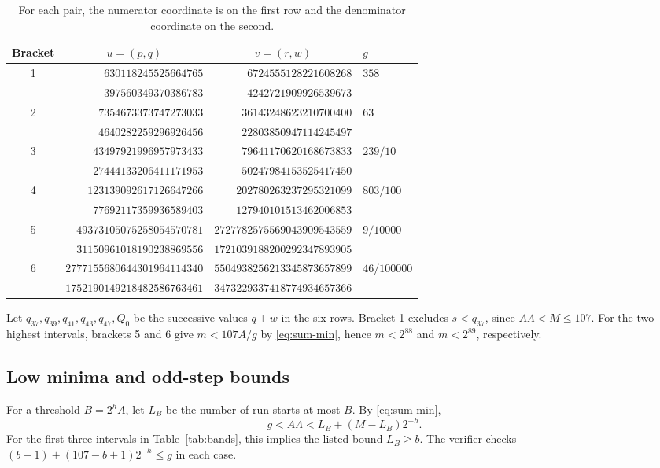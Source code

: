\documentclass[11pt]{article}
\theoremstyle{definition}
\begin{document}
\begin{table}[htbp]
\centering
\small
\begin{tabular}{@{}c r r l@{}}
\toprule
Bracket & \multicolumn{1}{c}{\(u=(p,q)\)} &
 \multicolumn{1}{c}{\(v=(r,w)\)} & \(g\)\\
\midrule
1 & \(630118245525664765\) & \(6724555128221608268\) & \(358\)\\
  & \(397560349370386783\) & \(4242721909926539673\) &\\[2pt]
2 & \(7354673373747273033\) & \(36143248623210700400\) & \(63\)\\
  & \(4640282259296926456\) & \(22803850947114245497\) &\\[2pt]
3 & \(43497921996957973433\) & \(79641170620168673833\) & \(239/10\)\\
  & \(27444133206411171953\) & \(50247984153525417450\) &\\[2pt]
4 & \(123139092617126647266\) & \(202780263237295321099\) & \(803/100\)\\
  & \(77692117359936589403\) & \(127940101513462006853\) &\\[2pt]
5 & \(49373105075258054570781\) & \(2727782575569043909543559\) &
  \(9/10000\)\\
  & \(31150961018190238869556\) & \(1721039188200292347893905\) &\\[2pt]
6 & \(2777155680644301964114340\) & \(5504938256213345873657899\) &
  \(46/100000\)\\
  & \(1752190149218482586763461\) & \(3473229337418774934657366\) &\\
\bottomrule
\end{tabular}
\caption{For each pair, the numerator coordinate is on the first row
and the denominator coordinate on the second.}
\label{tab:brackets}
\end{table}

Let \(q_{37},q_{39},q_{41},q_{43},q_{47},Q_0\) be the successive
values \(q+w\) in the six rows. Bracket 1 excludes \(s<q_{37}\),
since \(A\Lambda<M\le107\). For the two highest intervals,
brackets 5 and 6 give \(m<107A/g\) by \eqref{eq:sum-min}, hence
\(m<2^{88}\) and \(m<2^{89}\), respectively.

\subsection{Low minima and odd-step bounds}

For a threshold \(B=2^h A\), let \(L_B\) be the number of run starts
at most \(B\). By \eqref{eq:sum-min},
\begin{equation}\label{eq:low}
 g<A\Lambda<L_B+(M-L_B)2^{-h}.
\end{equation}
For the first three intervals in Table~\ref{tab:bands}, this implies
the listed bound \(L_B\ge b\). The verifier checks
\((b-1)+(107-b+1)2^{-h}\le g\) in each case.
\end{document}
